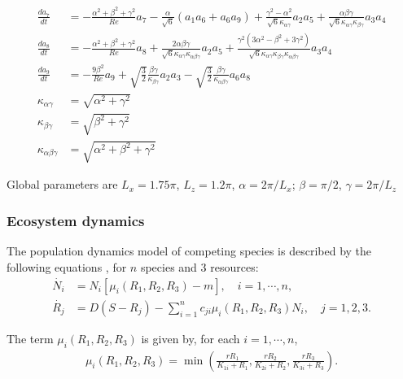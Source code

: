 \documentclass[%
 aip,
 amsmath,amssymb,
 reprint,%
]{revtex4-1}
\begin{document}
\begin{widetext}
\begin{align*}
\frac{da_7}{dt} &= -\frac{\alpha^2 + \beta^2 + \gamma^2}{Re} a_7 - \frac{\alpha}{\sqrt{6}}(a_1 a_6 + a_6 a_9) + \frac{\gamma^2 - \alpha^2}{\sqrt{6}\kappa_{\alpha\gamma}}a_2 a_5 + \frac{\alpha\beta\gamma}{\sqrt{6}\kappa_{\alpha\gamma}\kappa_{\beta\gamma}}a_3 a_4\\
\frac{da_8}{dt} &= -\frac{\alpha^2 + \beta^2 + \gamma^2}{Re} a_8 + \frac{2\alpha\beta\gamma}{\sqrt{6}\kappa_{\alpha\gamma}\kappa_{\alpha\beta\gamma}} a_2 a_5  + \frac{\gamma^2(3\alpha^2 - \beta^2 + 3\gamma^2)}{\sqrt{6} \kappa_{\alpha\gamma}\kappa_{\beta\gamma}\kappa_{\alpha\beta\gamma}}a_3 a_4\\
\frac{da_9}{dt} &= -\frac{9\beta^2}{Re} a_9 + \sqrt{\frac{3}{2}}\frac{\beta \gamma}{\kappa_{\beta\gamma}}a_2 a_3 - \sqrt{\frac{3}{2}}\frac{\beta\gamma}{\kappa_{\alpha\beta\gamma}}a_6 a_8\\
\kappa_{\alpha\gamma} &= \sqrt{\alpha^2 + \gamma^2}\\
\kappa_{\beta\gamma} &= \sqrt{\beta^2 + \gamma^2}\\
\kappa_{\alpha\beta\gamma} &= \sqrt{\alpha^2+ \beta^2 + \gamma^2}
\end{align*}

Global parameters are    $L_x = 1.75\pi$, $L_z = 1.2\pi$, $\alpha = 2\pi/L_x$; $\beta = \pi/2$,  $\gamma = 2\pi/L_z$ 

\end{widetext}

\subsubsection*{Ecosystem dynamics}
The population dynamics model of competing species is described by the following equations \cite{huisman2001fundamental}, for $n$ species and $3$ resources:
\begin{align*}
    \dot{N_i} &= N_i [\mu_i(R_1, R_2, R_3) - m ], \quad i = 1, \cdots, n, \\
    \dot{R_j} &= D (S - R_j) - \sum_{i=1}^n c_{ji} \mu_i(R_1, R_2, R_3) N_i, \quad j = 1, 2, 3.
\end{align*}

The term $\mu_i(R_1, R_2, R_3)$ is given by, for each $i = 1, \cdots, n$,
\begin{align*}
    \mu_i(R_1, R_2, R_3) = \min\left( \frac{r R_1}{K_{1i} + R_1}, \frac{r R_2}{K_{2i} + R_2}, \frac{r R_3}{K_{3i} + R_3} \right).
\end{align*}
\end{document}
